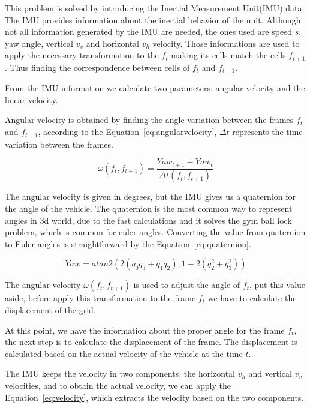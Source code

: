 This problem is solved by introducing the Inertial Measurement Unit(IMU) data. The IMU provides information about the inertial behavior of the unit. Although not all information generated by the IMU are needed, the ones used are speed $s$, yaw angle, vertical $v_v$ and horizontal $v_h$ velocity. Those informations are used to apply the necessary transformation to the $f_t$ making its cells match the cells $f_{t+1}$. Thus finding the correspondence between cells of $f_t$ and $f_{t+1}$.

From the IMU information we calculate two parameters: angular velocity and the linear velocity. 

Angular velocity is obtained by finding the angle variation between the frames $f_t$ and $f_{t+1}$, according to the Equation~\ref{eq:angularvelocity}, $\Delta t$ represents the time variation between the frames.

\begin{equation}
\label{eq:angularvelocity}
\omega(f_t,f_{t+1}) = \frac{Yaw_{t+1}-Yaw_t}{\Delta t(f_t,f_{t+1})} 
\end{equation} 

The angular velocity is given in degrees, but the IMU gives us a quaternion for the angle of the vehicle. The quaternion is the most common way to represent angles in 3d world, due to the fast calculations and it solves the gym ball lock problem, which is common for euler angles. Converting the value from quaternion to Euler angles is straightforward by the Equation~\ref{eq:quaternion}.

\begin{equation}
\label{eq:quaternion}
Yaw=atan2(2(q_0 q_3+q_1 q_2),1-2(q_2^2+q_3^2))
\end{equation}

The angular velocity $\omega(f_t,f_{t+1})$ is used to adjust the angle of $f_t$, put this value aside, before apply this transformation to the frame $f_t$ we have to calculate the displacement of the grid.

At this point, we have the information about the proper angle for the frame $f_t$, the next step is to calculate the displacement of the frame. The displacement is calculated based on the actual velocity of the vehicle at the time $t$. 

The IMU keeps the velocity in two components, the horizontal $v_h$ and vertical $v_v$ velocities, and to obtain the actual velocity, we can apply the Equation~\ref{eq:velocity}, which extracts the velocity based on the two components.


